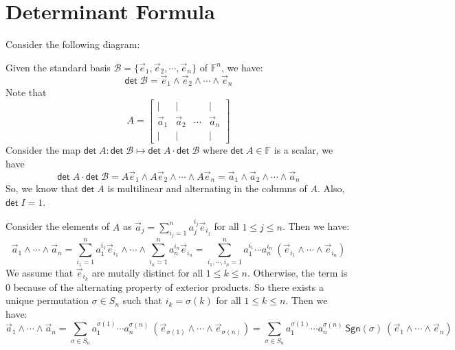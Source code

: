 \documentclass[
	11pt, %
	fleqn, %
	a4paper, %
]{LegrandOrangeBook}
\newcommand{\F}{\mathbb{F}} %
\newcommand{\B}{\mathcal{B}} %
\renewcommand{\det}{\mathsf{det\;}} %
\newcommand{\sgn}{\mathsf{Sgn}} %
\begin{document}
\newpage

\section{Determinant Formula}

Consider the following diagram:
\begin{center}
\end{center}
Given the standard basis $\B = \{ \vec{e}_1, \vec{e}_2, \cdots, \vec{e}_n \}$ of $\F^n$, we have:
\[
    \det \B = \vec{e}_1 \wedge \vec{e}_2 \wedge \cdots \wedge \vec{e}_n
\]
Note that 
\[
    A = \begin{bmatrix}
        | & | & & | \\
        \vec{a}_1 & \vec{a}_2 & \cdots & \vec{a}_n \\
        | & | & & |
    \end{bmatrix}
\]
Consider the map $\det A : \det \B \mapsto \det A \cdot \det \B$ where $\det A \in \F$ is a scalar, we have
\[
    \det A \cdot \det \B = A\vec{e}_1 \wedge A\vec{e}_2 \wedge \cdots \wedge A\vec{e}_n = \vec{a}_1 \wedge \vec{a}_2 \wedge \cdots \wedge \vec{a}_n
\]
So, we know that $\det A$ is multilinear and alternating in the columns of $A$. Also, $\det I = 1$. 

Consider the elements of $A$ as $\vec{a}_j = \sum_{i_j = 1}^n a_j^{i_j} \vec{e}_{i_j}$ for all $1 \leq j \leq n$. Then we have:
\[
    \vec{a}_1 \wedge \cdots \wedge \vec{a}_n = \sum_{i_1 = 1}^n a_1^{i_1} \vec{e}_{i_1} \wedge \cdots \wedge \sum_{i_n = 1}^n a_n^{i_n} \vec{e}_{i_n} = \sum_{i_1, \cdots, i_n = 1}^n a_1^{i_1} \cdots a_n^{i_n} \ (\vec{e}_{i_1} \wedge \cdots \wedge \vec{e}_{i_n})
\]
We assume that $\vec{e}_{i_k}$ are mutally distinct for all $1 \leq k \leq n$. Otherwise, the term is $0$ because of the alternating property of exterior products. So there exists a unique permutation $\sigma \in S_n$ such that $i_k = \sigma(k)$ for all $1 \leq k \leq n$. Then we have:
\[
    \vec{a}_1 \wedge \cdots \wedge \vec{a}_n = \sum_{\sigma \in S_n} a_1^{\sigma(1)} \cdots a_n^{\sigma(n)} \ (\vec{e}_{\sigma(1)} \wedge \cdots \wedge \vec{e}_{\sigma(n)}) = \sum_{\sigma \in S_n} a_1^{\sigma(1)} \cdots a_n^{\sigma(n)} \ \sgn(\sigma) \ (\vec{e}_1 \wedge \cdots \wedge \vec{e}_n)
\]
\end{document}
